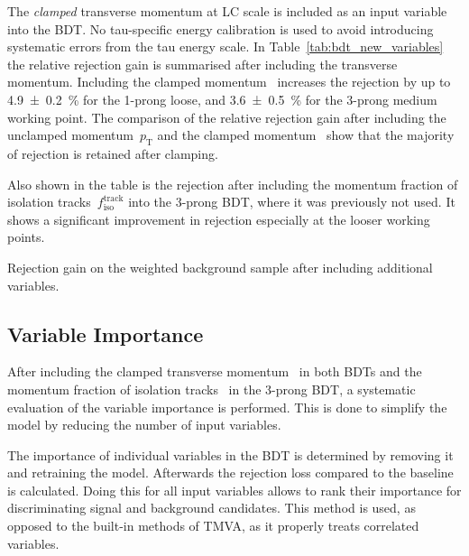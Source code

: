 The \emph{clamped} transverse momentum at LC scale is included as an input
variable into the BDT. No tau-specific energy calibration is used to avoid
introducing systematic errors from the tau energy scale. In
Table~\ref{tab:bdt_new_variables} the relative rejection gain is summarised
after including the transverse momentum. Including the clamped
momentum~ increases the rejection by up to
\SI{4.9 +- 0.2}{\percent} for the 1-prong loose, and \SI{3.6 +- 0.5}{\percent}
for the 3-prong medium working point. The comparison of the relative rejection
gain after including the unclamped momentum~$p_\text{T}$ and the clamped
momentum~ show that the majority of rejection
is retained after clamping.

Also shown in the table is the rejection after including the momentum fraction
of isolation tracks~$f_\text{iso}^\text{track}$ into the 3-prong BDT, where it
was previously not used. It shows a significant improvement in rejection
especially at the looser working points.

\begin{table}[htb]
  \centering
  {\small}
  \caption{Rejection gain on the weighted background sample after including
    additional variables.}
  \label{tab:bdt_new_variables}
\end{table}

\subsection{Variable Importance}
\label{sec:bdt_var_importance}

After including the clamped transverse
momentum~ in both BDTs and the momentum
fraction of isolation tracks~ in the 3-prong
BDT, a systematic evaluation of the variable importance is performed. This is
done to simplify the model by reducing the number of input variables.

The importance of individual variables in the BDT is determined by removing it
and retraining the model. Afterwards the rejection loss compared to the baseline
is calculated. Doing this for all input variables allows to rank their
importance for discriminating signal and background candidates. This method is
used, as opposed to the built-in methods of TMVA, as it properly treats
correlated variables.

